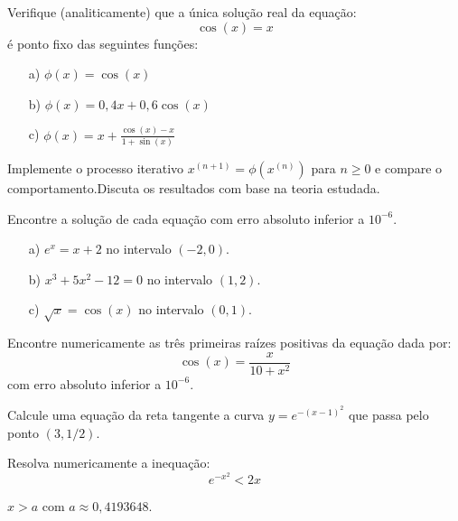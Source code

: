 \documentclass[main.tex]{subfiles}
\begin{document}
\begin{Exercise} Verifique (analiticamente) que a única solução real da equação:
  \begin{equation*}
    \cos(x)=x  
  \end{equation*}
é ponto fixo das seguintes funções:
\begin{itemize}
\item[a)] $\phi(x)=\cos(x)$
\item[b)] $\phi(x)=0,4 x+ 0,6\cos(x)$
\item[c)] $\phi(x)=x+\frac{\cos(x)-x}{1+\sin(x)}$
\end{itemize}
Implemente o processo iterativo $x^{(n+1)}=\phi(x^{(n)})$ para $n\geq 0$ e compare o comportamento.Discuta os resultados com base na teoria estudada.
\end{Exercise}


\begin{Exercise} Encontre a solução de cada equação com erro absoluto inferior a $10^{-6}$.
  \begin{itemize}
  \item[a)] $e^x=x+2$ no intervalo $(-2,0)$.
  \item[b)] $x^3+5x^2-12=0$ no intervalo $(1,2)$.
  \item[c)] $\sqrt{x}=\cos(x)$ no intervalo $(0,1)$.
  \end{itemize}
\end{Exercise}

\begin{Exercise} Encontre numericamente as três primeiras raízes positivas da equação dada por:
  \begin{equation*}
    \cos(x)=\frac{x}{10+x^2}  
  \end{equation*}
com erro absoluto inferior a $10^{-6}$.
\end{Exercise}

\begin{Exercise} Calcule uma equação da reta tangente a curva $y=e^{-(x-1)^2}$ que passa pelo ponto $(3, 1/2)$.
\end{Exercise}

\begin{Exercise} Resolva numericamente a inequação:
  \begin{equation*}
    e^{-x^2}<2x  
  \end{equation*}
\end{Exercise}
\begin{Answer}
  \begin{tiny}
    $x>a$ com $a\approx 0,4193648$.    
  \end{tiny}
\end{Answer}
\end{document}
